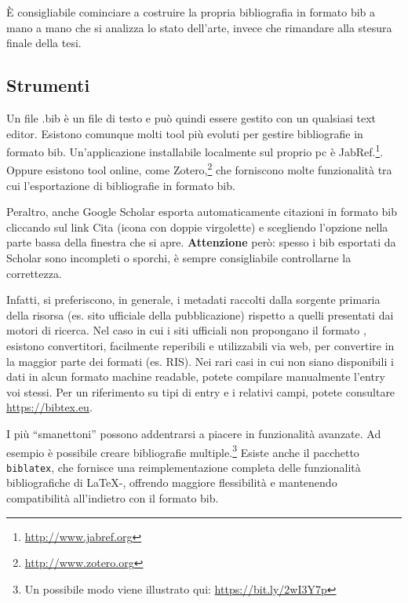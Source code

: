 \documentclass[12pt]{report}
\begin{document}
\`E consigliabile cominciare a costruire la propria bibliografia in formato bib a mano a mano che si analizza lo stato dell'arte, invece che rimandare alla stesura finale della tesi.

\subsection{Strumenti}

Un file .bib \`e un file di testo e pu\`o quindi essere gestito con un qualsiasi text editor. Esistono comunque molti tool pi\`u evoluti per gestire bibliografie in formato bib. Un'applicazione installabile localmente sul proprio pc \`e JabRef.\footnote{\url{http://www.jabref.org}}. Oppure esistono tool online, come Zotero,\footnote{\url{http://www.zotero.org}} che forniscono molte funzionalità tra cui l'esportazione di bibliografie in formato bib.

Peraltro, anche Google Scholar esporta automaticamente citazioni in formato bib cliccando sul link Cita (icona con doppie virgolette) e scegliendo l'opzione  nella parte bassa della finestra che si apre. \textbf{Attenzione} per\`o: spesso i bib esportati da Scholar sono incompleti o sporchi, \`e sempre consigliabile controllarne la correttezza.

Infatti, si preferiscono, in generale, i metadati raccolti dalla sorgente primaria della risorsa (es. sito ufficiale della pubblicazione) rispetto a quelli presentati dai motori di ricerca. Nel caso in cui i siti ufficiali non propongano il formato , esistono convertitori, facilmente reperibili e utilizzabili via web, per convertire in  la maggior parte dei formati (es. RIS). Nei rari casi in cui non siano disponibili i dati in alcun formato machine readable, potete compilare manualmente l'entry  voi stessi. Per un riferimento su tipi di entry e i relativi campi, potete consultare \url{https://bibtex.eu}.

I pi\`u ``smanettoni'' possono addentrarsi a piacere in funzionalit\`a avanzate. Ad esempio \`e possibile creare bibliografie multiple.\footnote{Un possibile modo viene illustrato qui: \url{https://bit.ly/2wI3Y7p}}
Esiste anche il pacchetto \texttt{biblatex}, che fornisce una reimplementazione completa delle funzionalit\`a bibliografiche di \LaTeX-, offrendo maggiore flessibilit\`a e mantenendo compatibilit\`a all'indietro con il formato bib.
\end{document}

